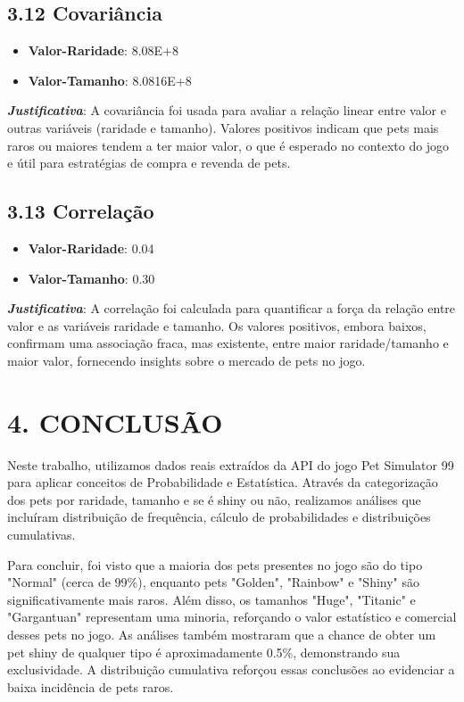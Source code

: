 \documentclass[12pt]{article}
\begin{document}
\subsection*{3.12 Covariância}
\begin{itemize}
    \item \textbf{Valor-Raridade}: 8.08E+8
    \item \textbf{Valor-Tamanho}: 8.0816E+8
\end{itemize}
\textbf{\textit{Justificativa}}: A covariância foi usada para avaliar a relação linear entre valor e outras variáveis (raridade e tamanho). Valores positivos indicam que pets mais raros ou maiores tendem a ter maior valor, o que é esperado no contexto do jogo e útil para estratégias de compra e revenda de pets.

\subsection*{3.13 Correlação}
\begin{itemize}
    \item \textbf{Valor-Raridade}: 0.04
    \item \textbf{Valor-Tamanho}: 0.30
\end{itemize}
\textbf{\textit{Justificativa}}: A correlação foi calculada para quantificar a força da relação entre valor e as variáveis raridade e tamanho. Os valores positivos, embora baixos, confirmam uma associação fraca, mas existente, entre maior raridade/tamanho e maior valor, fornecendo insights sobre o mercado de pets no jogo.

\section*{4. CONCLUSÃO}
Neste trabalho, utilizamos dados reais extraídos da API do jogo Pet Simulator 99 para aplicar conceitos de Probabilidade e Estatística. Através da categorização dos pets por raridade, tamanho e se é shiny ou não, realizamos análises que incluíram distribuição de frequência, cálculo de probabilidades e distribuições cumulativas.

Para concluir, foi visto que a maioria dos pets presentes no jogo são do tipo "Normal" (cerca de 99\%), enquanto pets "Golden", "Rainbow" e "Shiny" são significativamente mais raros. Além disso, os tamanhos "Huge", "Titanic" e "Gargantuan" representam uma minoria, reforçando o valor estatístico e comercial desses pets no jogo. As análises também mostraram que a chance de obter um pet shiny de qualquer tipo é aproximadamente 0.5\%, demonstrando sua exclusividade. A distribuição cumulativa reforçou essas conclusões ao evidenciar a baixa incidência de pets raros.
\end{document}
